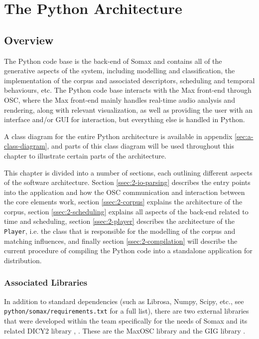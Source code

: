 \chapter{The Python Architecture}\label{sec:2-python-architecture}



\section{Overview}\label{ssec:2-overview}
The Python code base is the back-end of Somax and contains all of the generative aspects of the system, including modelling and classification, the implementation of the corpus and associated descriptors, scheduling and temporal behaviours, etc. The Python code base interacts with the Max front-end through OSC, where the Max front-end mainly handles real-time audio analysis and rendering, along with relevant visualization, as well as providing the user with an interface and/or GUI for interaction, but everything else is handled in Python.

A class diagram for the entire Python architecture is available in appendix \ref{sec:a-class-diagram}, and parts of this class diagram will be used throughout this chapter to illustrate certain parts of the architecture.

This chapter is divided into a number of sections, each outlining different aspects of the software architecture. Section \ref{ssec:2-io-parsing} describes the entry points into the application and how the OSC communication and interaction between the core elements work, section \ref{ssec:2-corpus} explains the architecture of the corpus, section \ref{ssec:2-scheduling} explains all aspects of the back-end related to time and scheduling, section \ref{ssec:2-player} describes the architecture of the \texttt{Player}, i.e. the class that is responsible for the modelling of the corpus and matching influences, and finally section \ref{ssec:2-compilation} will describe the current procedure of compiling the Python code into a standalone application for distribution.


\subsection{Associated Libraries}\label{ssec:2-librarybranches}
In addition to standard dependencies (such as Librosa, Numpy, Scipy, etc., see \texttt{python/somax/requirements.txt} for a full list), there are two external libraries that were developed within the team specifically for the needs of Somax and its related DICY2 library \cite{nika2016thesis}, \cite{nika2022dicy2}. These are the MaxOSC library \cite{maxoscrepo} and the GIG library \cite{gigrepo}. 



